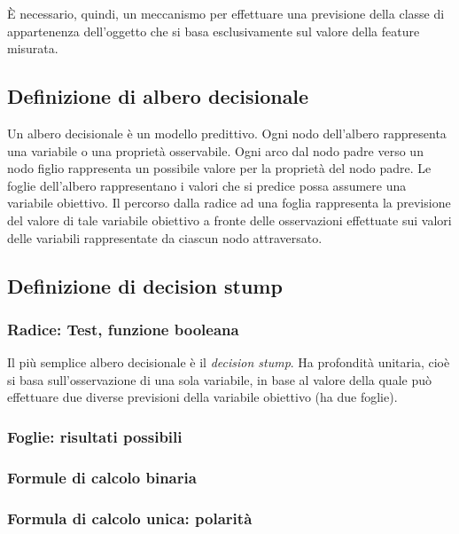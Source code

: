             È necessario, quindi, un meccanismo per effettuare una previsione della classe di appartenenza dell'oggetto che si basa esclusivamente sul valore della feature misurata.

        \subsection{Definizione di albero decisionale}
        Un albero decisionale è un modello predittivo. Ogni nodo dell'albero rappresenta una variabile o una proprietà osservabile. Ogni arco dal nodo padre verso un nodo figlio rappresenta un possibile valore per la proprietà del nodo padre. Le foglie dell'albero rappresentano i valori che si predice possa assumere una variabile obiettivo. Il percorso dalla radice ad una foglia rappresenta la previsione del valore di tale variabile obiettivo a fronte delle osservazioni effettuate sui valori delle variabili rappresentate da ciascun nodo attraversato.
        \subsection{Definizione di decision stump}
            \subsubsection{Radice: Test, funzione booleana}
            Il più semplice albero decisionale è il \emph{decision stump}. Ha profondità unitaria, cioè si basa sull'osservazione di una sola variabile, in base al valore della quale può effettuare due diverse previsioni della variabile obiettivo (ha due foglie).
            \subsubsection{Foglie: risultati possibili}
            \subsubsection{Formule di calcolo binaria}
            \subsubsection{Formula di calcolo unica: polarità}
